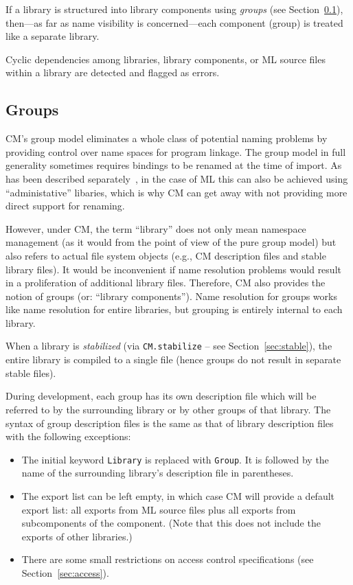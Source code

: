\documentclass[titlepage,letterpaper]{article}
\begin{document}
If a library is structured into library components using {\em groups}
(see Section~\ref{sec:groups}), then---as far as name visibility is
concerned---each component (group) is treated like a separate library.

Cyclic dependencies among libraries, library components, or ML source
files within a library are detected and flagged as errors.

\subsection{Groups}
\label{sec:groups}

CM's group model eliminates a whole class of potential naming problems
by providing control over name spaces for program linkage.  The group
model in full generality sometimes requires bindings to be renamed at
the time of import. As has been described
separately~\cite{blume:appel:cm99}, in the case of ML this can also be
achieved using ``administative'' libaries, which is why CM can get
away with not providing more direct support for renaming.

However, under CM, the term ``library'' does not only mean namespace
management (as it would from the point of view of the pure group
model) but also refers to actual file system objects (e.g., CM
description files and stable library files).  It would be inconvenient
if name resolution problems would result in a proliferation of
additional library files.  Therefore, CM also provides the notion of
groups (or: ``library components'').  Name resolution for groups works
like name resolution for entire libraries, but grouping is entirely
internal to each library.

When a library is {\em stabilized} (via {\tt CM.stabilize} -- see
Section~\ref{sec:stable}), the entire library is compiled to a single
file (hence groups do not result in separate stable files).

During development, each group has its own description file which will
be referred to by the surrounding library or by other groups of that
library. The syntax of group description files is the same as that of
library description files with the following exceptions:

\begin{itemize}
\item The initial keyword {\tt Library} is replaced with {\tt Group}.
It is followed by the name of the surrounding library's description
file in parentheses.
\item The export list can be left empty, in which case CM will provide
a default export list: all exports from ML source files plus all
exports from subcomponents of the component.  (Note that this does not
include the exports of other libraries.)
\item There are some small restrictions on access control
specifications (see Section~\ref{sec:access}).
\end{itemize}
\end{document}
